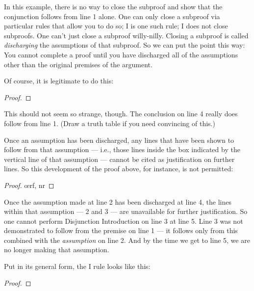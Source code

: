 In this example, there is no way to close the subproof and show that the conjunction follows from line 1 alone. One can only close a subproof via particular rules that allow you to do so; {\eif}I is one such rule; {\eand}I does not close subproofs. One can't just close a subproof willy-nilly. Closing a subproof is called \emph{discharging} the assumptions of that subproof. So we can put the point this way: You cannot complete a proof until you have discharged all of the assumptions other than the original premises of the argument.

Of course, it is legitimate to do this:

\begin{proof}
	\metaA{}
	\open
		\metaB{}
		 
	\close
	 
\end{proof}

This should not seem so strange, though. The conclusion on line 4 really does follow from line 1. (Draw a truth table if you need convincing of this.) 

Once an assumption has been discharged, any lines that have been shown to follow from that assumption --- i.e., those lines inside the box indicated by the vertical line of that assumption --- cannot be cited as justification on further lines. So this development of the proof above, for instance, is not permitted:

\begin{proof}
	\open
		\oe{rf, nr}
	\close
\end{proof}

Once the assumption made at line 2 has been discharged at line 4, the lines within that assumption --- 2 and 3 --- are unavailable for further justification. So one cannot perform Disjunction Introduction on line 3 at line 5. Line 3 was not demonstrated to follow from the premise on line 1 --- it follows only from this combined with the \emph{assumption} on line 2. And by the time we get to line 5, we are no longer making that assumption.

Put in its general form, the {\eif}I rule looks like this:

\begin{proof}
	\open
		\metaA{} 
		\metaB{}
	\close
\end{proof}


